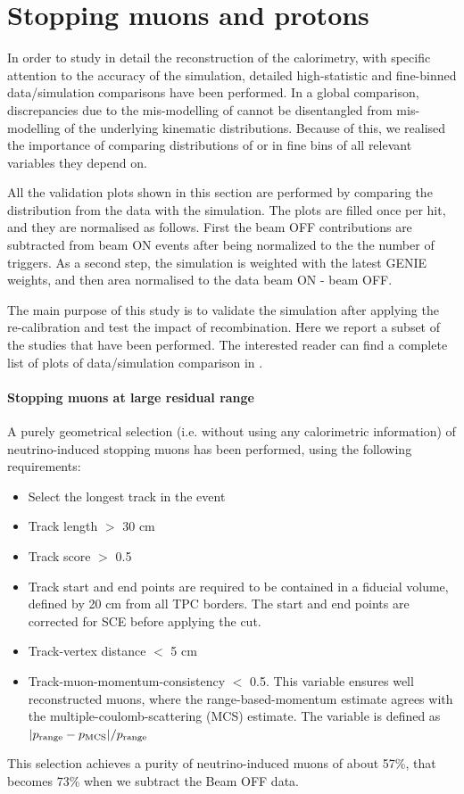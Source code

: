 \section{Stopping muons and protons}
\label{sec:sideband:stopping_muons_protons}

In order to study in detail the reconstruction of the calorimetry, with specific attention to the accuracy of the simulation, detailed high-statistic and fine-binned data/simulation comparisons have been performed.
In a global comparison, discrepancies due to the mis-modelling of \dedx cannot be disentangled from mis-modelling of the underlying kinematic distributions.
Because of this, we realised the importance of comparing distributions of \dqdx or \dedx in fine bins of all relevant variables they depend on.

All the validation plots shown in this section are performed by comparing the \dqdx distribution from the data with the simulation.
The plots are filled once per hit, and they are normalised as follows.
First the beam OFF contributions are subtracted from beam ON events after being normalized to the the number of triggers.
As a second step, the simulation is weighted with the latest GENIE weights, and then area normalised to the data beam ON - beam OFF.

The main purpose of this study is to validate the simulation after applying the re-calibration and test the impact of recombination.
Here we report a subset of the studies that have been performed.
The interested reader can find a complete list of plots of data/simulation comparison in \cite{bib:pid_internal_note}.

\paragraph{Stopping muons at large residual range}
A purely geometrical selection (i.e. without using any calorimetric information) of neutrino-induced stopping muons has been performed, using the following requirements:
\begin{itemize}
    \item Select the longest track in the event
    \item Track length $>$ 30 cm
    \item Track score $>$ 0.5
    \item Track start and end points are required to be contained in a fiducial volume, defined by 20 cm from all TPC borders. The start and end points are corrected for SCE before applying the cut.
    \item Track-vertex distance $<$ 5 cm
    \item Track-muon-momentum-consistency $<$ 0.5. This variable ensures well reconstructed muons, where the range-based-momentum estimate agrees with the multiple-coulomb-scattering (MCS) estimate. The variable is defined as $\displaystyle |p_{\rm range} - p_{\rm MCS}|/p_{\rm range}$
\end{itemize}
This selection achieves a purity of neutrino-induced muons of about 57\%, that becomes 73\% when we subtract the Beam OFF data.

